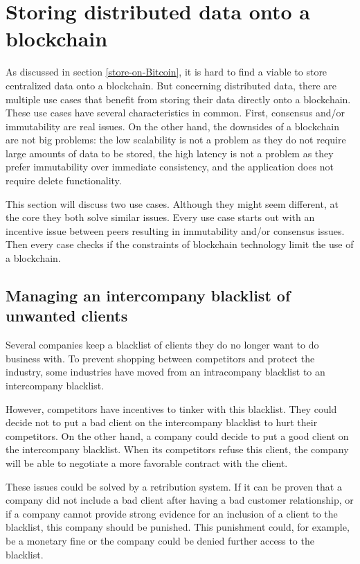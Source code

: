\section{Storing distributed data onto a blockchain}
\label{resource-allocation}

As discussed in section \ref{store-on-Bitcoin}, it is hard to find a viable to store centralized data onto a blockchain. But concerning distributed data, there are multiple use cases that benefit from storing their data directly onto a blockchain. These use cases have several characteristics in common. First, consensus and/or immutability are real issues. On the other hand, the downsides of a blockchain are not big problems: the low scalability is not a problem as they do not require large amounts of data to be stored, the high latency is not a problem as they prefer immutability over immediate consistency, and the application does not require delete functionality. 

This section will discuss two use cases. Although they might seem different, at the core they both solve similar issues. Every use case starts out with an incentive issue between peers resulting in immutability and/or consensus issues. Then every case checks if the constraints of blockchain technology limit the use of a blockchain.

\subsection{Managing an intercompany blacklist of unwanted clients}
\label{blacklist}

Several companies keep a blacklist of clients they do no longer want to do business with. To prevent shopping between competitors and protect the industry, some industries have moved from an intracompany blacklist to an intercompany blacklist. 

However, competitors have incentives to tinker with this blacklist. They could decide not to put a bad client on the intercompany blacklist to hurt their competitors. On the other hand, a company could decide to put a good client on the intercompany blacklist. When its competitors refuse this client, the company will be able to negotiate a more favorable contract with the client.

These issues could be solved by a retribution system. If it can be proven that a company did not include a bad client after having a bad customer relationship, or if a company cannot provide strong evidence for an inclusion of a client to the blacklist, this company should be punished. This punishment could, for example, be a monetary fine or the company could be denied further access to the blacklist.

